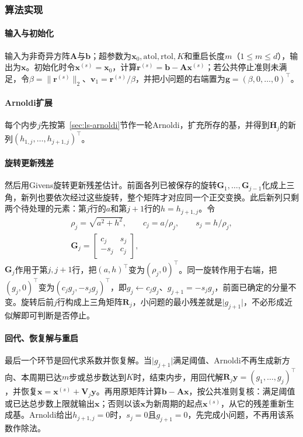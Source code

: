 \subsubsection{算法实现}

\paragraph{输入与初始化}
输入为非奇异方阵$\bm A$与$\bm b$；超参数为$\bm x_0,\mathrm{atol},\mathrm{rtol},K$和重启长度$m$（$1\le m\le d$），输出为$\bm x$。初始化时令$\bm x^{(s)}=\bm x_0$，计算$\bm r^{(s)}=\bm b-\bm A\bm x^{(s)}$；若公共停止准则未满足，令$\beta=\lVert\bm r^{(s)}\rVert_2$、$\bm v_1=\bm r^{(s)}/\beta$，并把小问题的右端置为$\bm g=(\beta,0,\ldots,0)^\top$。

\paragraph{Arnoldi扩展}
每个内步$j$先按第~\ref{sec:ls-arnoldi}节作一轮Arnoldi，扩充所存的基，并得到$\overline{\bm H}_j$的新列$(h_{1,j},\ldots,h_{j+1,j})^\top$。

\paragraph{旋转更新残差}
然后用Givens旋转更新残差估计。前面各列已被保存的旋转$\bm G_1,\ldots,\bm G_{j-1}$化成上三角，新列也要依次经过这些旋转，整个矩阵才对应同一个正交变换。此后新列只剩两个待处理的元素：第$j$行的$a$和第$j+1$行的$h=h_{j+1,j}$。令
\[
 \begin{gathered}
 \rho_j=\sqrt{a^2+h^2},\qquad c_j=a/\rho_j,\qquad s_j=h/\rho_j,\\
 \bm G_j=\begin{bmatrix}c_j&s_j\\-s_j&c_j\end{bmatrix},
 \end{gathered}
\]
$\bm G_j$作用于第$j,j+1$行，把$(a,h)^\top$变为$(\rho_j,0)^\top$。同一旋转作用于右端，把$(g_j,0)^\top$变为$(c_jg_j,-s_jg_j)^\top$，即$g_j\leftarrow c_jg_j$、$g_{j+1}=-s_jg_j$，前面已确定的分量不变。旋转后前$j$行构成上三角矩阵$\bm R_j$，小问题的最小残差就是$\lvert g_{j+1}\rvert$，不必形成近似解即可判断是否停止。

\paragraph{回代、恢复解与重启}
最后一个环节是回代求系数并恢复解。当$\lvert g_{j+1}\rvert$满足阈值、Arnoldi不再生成新方向、本周期已达$m$步或总步数达到$K$时，结束内步，用回代解$\bm R_j\bm y=(g_1,\ldots,g_j)^\top$，并恢复$\bm x=\bm x^{(s)}+\bm V_j\bm y$。再用原矩阵计算$\bm b-\bm A\bm x$，按公共准则复核：满足阈值或已达总步数上限就输出$\bm x$；否则以该$\bm x$为新周期的起点$\bm x^{(s)}$，从它的残差重新生成基。Arnoldi给出$h_{j+1,j}=0$时，$s_j=0$且$g_{j+1}=0$，先完成小问题，不再用该系数作除法。

